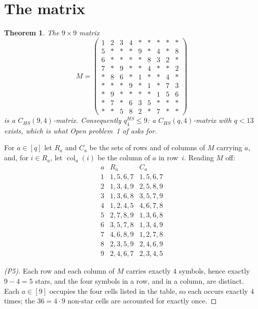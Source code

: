 \documentclass[11pt]{amsart}
\newtheorem{theorem}{Theorem}
\theoremstyle{definition}
\theoremstyle{remark}
\DeclareMathOperator{\col}{col}
\newcommand{\st}{\ast}
\begin{document}
\section{The matrix}

\begin{theorem}\label{thm:main}
The $9\times9$ matrix
\[
M=
\begin{pmatrix}
1&2&3&4&\st&\st&\st&\st&\st\\
5&\st&\st&\st&9&\st&4&\st&8\\
6&\st&\st&\st&\st&8&3&2&\st\\
7&\st&9&\st&\st&4&\st&\st&2\\
\st&8&6&\st&1&\st&\st&4&\st\\
\st&\st&\st&9&\st&1&\st&7&3\\
\st&9&\st&\st&\st&\st&1&5&6\\
\st&7&\st&6&3&5&\st&\st&\st\\
\st&\st&5&8&2&\st&7&\st&\st
\end{pmatrix}
\]
is a $C_{HS}(9,4)$-matrix. Consequently $q_4^{HS}\le 9$: a $C_{HS}(q,4)$-matrix
with $q<13$ exists, which is what Open problem~1 of \cite{Dya} asks for.
\end{theorem}

For $a\in[q]$ let $R_a$ and $C_a$ be the sets of rows and of columns of $M$
carrying $a$, and, for $i\in R_a$, let $\col_a(i)$ be the column of $a$ in
row~$i$. Reading $M$ off:
\[
\renewcommand{\arraystretch}{1.05}
\begin{array}{r|l|l}
a & R_a & C_a\\\hline
1 & 1,5,6,7 & 1,5,6,7\\
2 & 1,3,4,9 & 2,5,8,9\\
3 & 1,3,6,8 & 3,5,7,9\\
4 & 1,2,4,5 & 4,6,7,8\\
5 & 2,7,8,9 & 1,3,6,8\\
6 & 3,5,7,8 & 1,3,4,9\\
7 & 4,6,8,9 & 1,2,7,8\\
8 & 2,3,5,9 & 2,4,6,9\\
9 & 2,4,6,7 & 2,3,4,5
\end{array}
\]

\begin{proof}[(P5)]
Each row and each column of $M$ carries exactly $4$ symbols, hence exactly
$9-4=5$ stars, and the four symbols in a row, and in a column, are distinct.
Each $a\in[9]$ occupies the four cells listed in the table, so each occurs
exactly $4$ times; the $36=4\cdot9$ non-star cells are accounted for exactly
once.
\end{proof}
\end{document}
